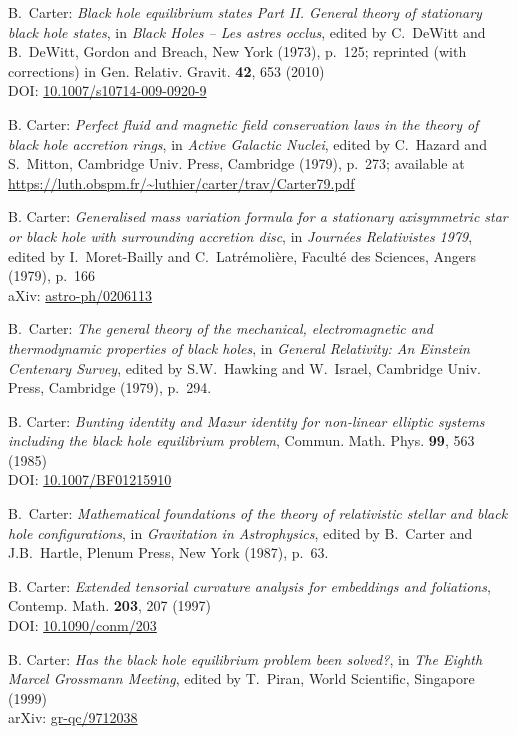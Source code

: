 \begin{thebibliography}{123}
B.~Carter:
{\em Black hole equilibrium states Part II. General theory of stationary black hole states}, in {\em Black Holes -- Les astres occlus}, edited by C.~DeWitt and B.~DeWitt,
Gordon and Breach, New York (1973), p.~125; reprinted (with corrections) in
Gen. Relativ. Gravit. {\bf 42}, 653 (2010)\\
DOI: \href{https://doi.org/10.1007/s10714-009-0920-9}{10.1007/s10714-009-0920-9}

B. Carter:
{\em Perfect fluid and magnetic field conservation laws in the theory of black hole accretion rings},
in {\em Active Galactic Nuclei}, edited by C.~Hazard and S.~Mitton,
Cambridge Univ. Press, Cambridge (1979), p.~273; available at\\
\url{https://luth.obspm.fr/~luthier/carter/trav/Carter79.pdf}

B. Carter:
{\em Generalised mass variation formula for a stationary axisymmetric star or black hole with surrounding accretion disc},
in {\em Journées Relativistes 1979}, edited by  I.~Moret-Bailly and C.~Latrémolière,
Faculté des Sciences, Angers (1979), p.~166\\
aXiv: \href{https://arxiv.org/abs/astro-ph/0206113}{astro-ph/0206113}

B.~Carter:
{\em The general theory of the mechanical, electromagnetic and thermodynamic properties of black holes}, in {\em General Relativity: An Einstein Centenary Survey},
edited by S.W.~Hawking and W.~Israel,
Cambridge Univ. Press, Cambridge (1979), p.~294.

B. Carter:
{\em Bunting identity and Mazur identity for non-linear elliptic systems including the black hole equilibrium problem},
Commun. Math. Phys. {\bf 99}, 563 (1985)\\
DOI: \href{https://doi.org/10.1007/BF01215910}{10.1007/BF01215910}

B.~Carter:
{\em Mathematical foundations of the theory of
relativistic stellar and black hole configurations},
in {\em Gravitation in Astrophysics}, edited by B.~Carter and J.B.~Hartle,
Plenum Press, New York (1987), p.~63.

B. Carter:
{\em Extended tensorial curvature analysis for embeddings and foliations},
Contemp. Math. {\bf 203}, 207 (1997)\\
DOI: \href{http://dx.doi.org/10.1090/conm/203}{10.1090/conm/203}

B. Carter: {\em Has the black hole equilibrium problem been solved?},
in {\em The Eighth Marcel Grossmann Meeting}, edited by T.~Piran,
World Scientific, Singapore (1999)\\
arXiv: \href{https://arxiv.org/abs/gr-qc/9712038}{gr-qc/9712038}


\end{thebibliography}
